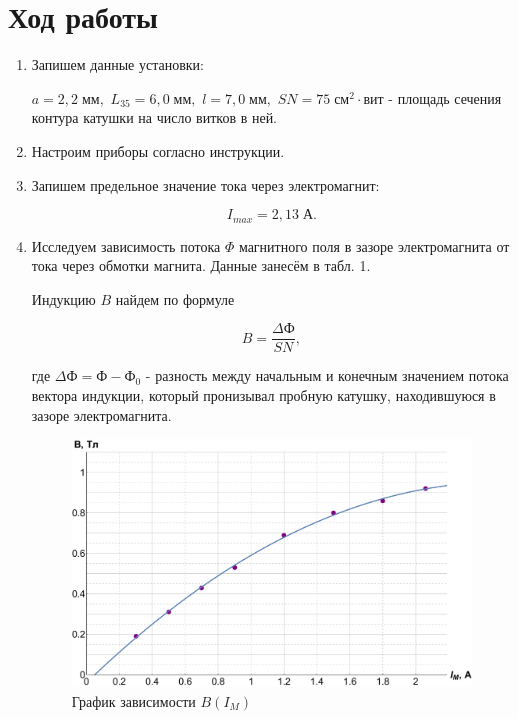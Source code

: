 \documentclass[12pt]{kiarticle}
\begin{document}
  	\section{Ход работы}
  	
  	\begin{enumerate}
  	\item Запишем данные установки:
  	
  	$a=2,2 \; мм,$ $L_{35}=6,0 \;мм,$ $l=7,0 \;мм,$ $SN=75 \;см^{2}\cdot вит$ - площадь сечения контура катушки на число витков в ней.
  	
  	\item Настроим приборы согласно инструкции.
  	
  	\item Запишем предельное значение тока через электромагнит:
  	
  	$$ I_{max}=2,13 \; А.$$
  	
  	\item Исследуем зависимость потока $ \Phi $ магнитного поля в зазоре электромагнита от тока через обмотки магнита. Данные занесём в табл. 1.
  	
  	Индукцию $B$ найдем по формуле
  	
  \begin{equation}\label{}
  	B=\dfrac{\Delta Ф}{SN},
  \end{equation}
  	
  	где $\Delta Ф = Ф - Ф_{0}$ - разность между начальным и конечным значением потока вектора индукции, который пронизывал пробную катушку, находившуюся в зазоре электромагнита.
  	
  	
\begin{figure}[h!]
	\includegraphics[scale=0.5]{B.pdf}
	\caption{График зависимости $ B(I_M) $}
\end{figure}
  	

\end{enumerate}
\end{document}
